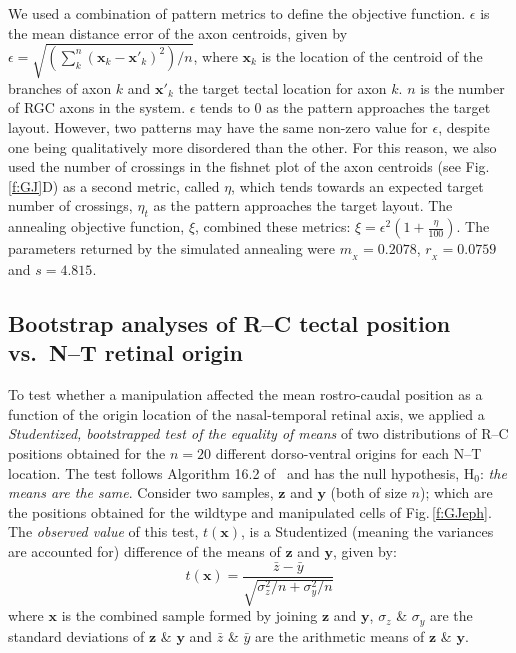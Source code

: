 \documentclass[9pt,lineno,draft]{elife}
\begin{document}
We used a combination of pattern metrics to define the objective function. $\epsilon$ is the mean distance error of the axon centroids, given by $\epsilon = \sqrt{\left(\sum_k^n (\mathbf{x}_{k} - \mathbf{x}'_{k})^2\right)/n}$,
%
%
where $\mathbf{x}_{k}$ is the location of the centroid of the branches of axon $k$ and $\mathbf{x}'_{k}$ the target tectal location for axon $k$.
$n$ is the number of RGC axons in the system.
%
$\epsilon$ tends to 0 as the pattern approaches the target layout.
However, two patterns may have the same non-zero value for $\epsilon$, despite one being qualitatively more disordered than the other.
For this reason, we also used the number of crossings in the fishnet plot of the axon centroids (see Fig.\,\ref{f:GJ}D) as a second metric, called $\eta$, which tends towards an expected target number of crossings, $\eta_t$ as the pattern approaches the target layout. The annealing objective function, $\xi$, combined these metrics: $\xi = \epsilon^2 (1+\frac{\eta}{100})$.
The parameters returned by the simulated annealing were
$m_{\!_X} = 0.2078$, $r_{\!_X} = 0.0759$ and $s = 4.815$.

\subsection*{Bootstrap analyses of R--C tectal position vs.~N--T retinal origin}

To test whether a manipulation affected the mean rostro-caudal position as a function of the origin location of the nasal-temporal retinal axis, we applied a \emph{Studentized, bootstrapped test of the equality of means} of two distributions of R--C positions obtained for the $n=20$ different dorso-ventral origins for each N--T location.
The test follows Algorithm 16.2 of~\cite{efron_introduction_1993} and has the null hypothesis, H$_0$: \emph{the means are the same}.
Consider two samples, $\textbf{z}$ and $\textbf{y}$ (both of size $n$); which are the positions obtained for the wildtype and manipulated cells of Fig.\,\ref{f:GJeph}.
The \emph{observed value} of this test, $t(\textbf{x})$, is a Studentized (meaning the variances are accounted for) difference of the means of $\textbf{z}$ and $\textbf{y}$, given by:
%
$$t(\textbf{x}) =  \frac{\bar{z} - \bar{y}}{\sqrt{\sigma_{z}^2/n + \sigma_{y}^2/n} } $$
%
where $\textbf{x}$ is the combined sample formed by joining $\textbf{z}$ and $\textbf{y}$, $\sigma_z$ \& $\sigma_y$ are the standard deviations of $\textbf{z}$ \& $\textbf{y}$ and $\bar{z}$ \& $\bar{y}$ are the arithmetic means of $\textbf{z}$ \& $\textbf{y}$.
\end{document}
